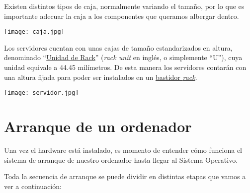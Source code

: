 Existen distintos tipos de caja, normalmente variando el tamaño, por lo que es importante adecuar la caja a los componentes que queramos albergar dentro.

\vspace{10pt}

\begin{center}
    \texttt{[image: caja.jpg]}
    \vspace{-10pt}
\end{center}


Los servidores cuentan con unas cajas de tamaño estandarizados en altura, denominado “\href{https://es.wikipedia.org/wiki/Unidad_rack}{Unidad de Rack}” (\textit{rack unit} en inglés, o simplemente “U”), cuya unidad equivale a 44.45 milímetros. De esta manera los servidores contarán con una altura fijada para poder ser instalados en un \href{https://es.wikipedia.org/wiki/Bastidor_de_19_pulgadas}{bastidor \textit{rack}}.

\begin{center}
    \texttt{[image: servidor.jpg]}
    \vspace{-10pt}
\end{center}


\section{Arranque de un ordenador}

Una vez el hardware está instalado, es momento de entender cómo funciona el sistema de arranque de nuestro ordenador hasta llegar al Sistema Operativo.

Toda la secuencia de arranque se puede dividir en distintas etapas que vamos a ver a continuación:

